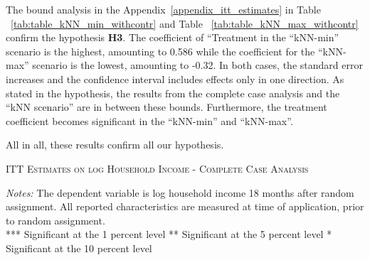 The bound analysis in the Appendix~\ref{appendix_itt_estimates} in Table ~\ref{tab:table_kNN_min_withcontr} and Table ~\ref{tab:table_kNN_max_withcontr} confirm the hypothesis \textbf{H3}. The coefficient of ``Treatment in the ``kNN-min'' scenario is the highest, amounting to 0.586 while the coefficient for the ``kNN-max'' scenario is the lowest, amounting to -0.32. In both cases, the standard error increases and the confidence interval includes effects only in one direction. As stated in the hypothesis, the results from the complete case analysis and the ``kNN scenario'' are in between these bounds. Furthermore, the treatment coefficient becomes significant in the ``kNN-min'' and ``kNN-max''.

All in all, these results confirm all our hypothesis.



\begin{table}[t!]
\centering
\caption{\textsc{ITT Estimates on log Household Income - Complete Case Analysis}}



\medskip
\begin{adjustbox}{width=0.825\textwidth, totalheight=\textheight, keepaspectratio}

\end{adjustbox}

\label{tab:table_complete_withcontr}
\bigskip
\raggedright
\footnotesize
\textit{Notes:} The dependent variable is log household income 18 months after random assignment. All reported characteristics are measured at time of application, prior to random assignment. \\
*** Significant at the 1 percent level ** Significant at the 5 percent level * Significant at the 10 percent level
\end{table}

